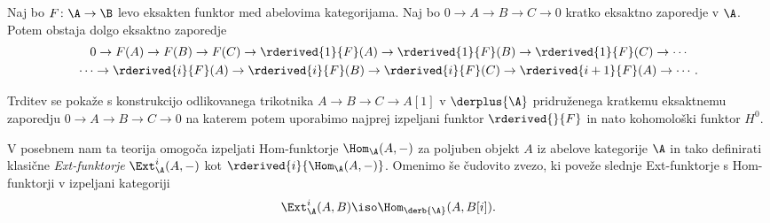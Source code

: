 \begin{trditev}
    \label{dolgo eksaktno zaporedje izpeljanega funktorja}
    Naj bo $F \colon \A \to \B$ levo eksakten funktor med abelovima kategorijama. Naj bo $0 \to A \to B \to C \to 0$ kratko eksaktno zaporedje v $\A$. Potem obstaja dolgo eksaktno zaporedje 
    \begin{multline*}
        0 \to F(A) \to F(B) \to F(C) \to \rderived{1}{F}(A) \to \rderived{1}{F}(B) \to \rderived{1}{F}(C) \to \cdots \\
        \cdots \to \rderived{i}{F}(A) \to \rderived{i}{F}(B) \to \rderived{i}{F}(C) \to \rderived{i+1}{F}(A) \to \cdots.
    \end{multline*}
\end{trditev}
Trditev se pokaže s konstrukcijo odlikovanega trikotnika $A \to B \to C \to A[1]$ v $\derplus{\A}$ pridruženega kratkemu eksaktnemu zaporedju $0 \to A \to B \to C \to 0$ na katerem potem uporabimo najprej izpeljani funktor $\rderived{}{F}$ in nato kohomološki funktor $H^0$.

V posebnem nam ta teorija omogoča izpeljati Hom-funktorje $\Hom_\A(A, -)$ za poljuben objekt $A$ iz abelove kategorije $\A$ in tako definirati klasične \emph{Ext-funktorje} $\Ext^i_\A(A, -)$ kot $\rderived{i}{\Hom_\A(A,-)}$. Omenimo še čudovito zvezo, ki poveže slednje Ext-funktorje s Hom-funktorji v izpeljani kategoriji
\begin{equation}
    \label{eq: čudovita enačba}
    \Ext^i_\A(A, B) \iso \Hom_{\derb{\A}}(A, B[i]).
\end{equation}  




